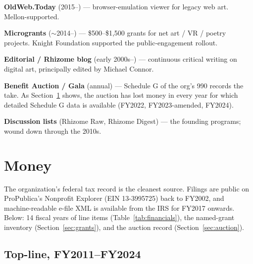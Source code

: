 \documentclass[10pt,letterpaper,twocolumn]{article}
\begin{document}
\textbf{OldWeb.Today} (2015--) --- browser-emulation viewer for legacy web art. Mellon-supported.

\textbf{Microgrants} ($\sim$2014--) --- \$500--\$1{,}500 grants for net art / VR / poetry projects. Knight Foundation supported the public-engagement rollout.

\textbf{Editorial / Rhizome blog} (early 2000s--) --- continuous critical writing on digital art, principally edited by Michael Connor.

\textbf{Benefit Auction / Gala} (annual) --- Schedule G of the org's 990 records the take. As Section~\ref{sec:money} shows, the auction has lost money in every year for which detailed Schedule G data is available (FY2022, FY2023-amended, FY2024).

\textbf{Discussion lists} (Rhizome Raw, Rhizome Digest) --- the founding programs; wound down through the 2010s.

\section{Money}\label{sec:money}

The organization's federal tax record is the cleanest source. Filings are public on ProPublica's Nonprofit Explorer (EIN 13-3995725) back to FY2002, and machine-readable e-file XML is available from the IRS for FY2017 onwards. Below: 14 fiscal years of line items (Table~\ref{tab:financials}), the named-grant inventory (Section~\ref{sec:grants}), and the auction record (Section~\ref{sec:auction}).

\subsection{Top-line, FY2011--FY2024}
\end{document}
